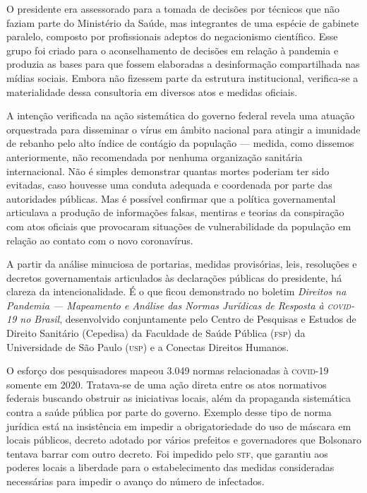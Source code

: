 O presidente era assessorado para a tomada de decisões por técnicos que
não faziam parte do Ministério da Saúde, mas integrantes de uma espécie
de gabinete paralelo, composto por profissionais adeptos do negacionismo
científico. Esse grupo foi criado para o aconselhamento de decisões em
relação à pandemia e produzia as bases para que fossem elaboradas a
desinformação compartilhada nas mídias sociais. Embora não fizessem
parte da estrutura institucional, verifica-se a materialidade dessa
consultoria em diversos atos e medidas oficiais.

A intenção verificada na ação sistemática do governo federal revela uma
atuação orquestrada para disseminar o vírus em âmbito nacional para
atingir a imunidade de rebanho pelo alto índice de contágio da
população --- medida, como dissemos anteriormente, não recomendada por
nenhuma organização sanitária internacional. Não é simples demonstrar
quantas mortes poderiam ter sido evitadas, caso houvesse uma conduta
adequada e coordenada por parte das autoridades públicas. Mas é possível
confirmar que a política governamental articulava a produção de
informações falsas, mentiras e teorias da conspiração com atos oficiais
que provocaram situações de vulnerabilidade da população em relação ao
contato com o novo coronavírus.

A partir da análise minuciosa de portarias, medidas provisórias,
leis, resoluções e decretos governamentais articulados às declarações
públicas do presidente, há clareza da intencionalidade. É o que ficou
demonstrado no boletim \textit{Direitos na Pandemia --- Mapeamento e Análise das
Normas Jurídicas de Resposta à \textsc{covid-19} no Brasil}, desenvolvido
conjuntamente pelo Centro de Pesquisas e Estudos de Direito Sanitário
(Cepedisa) da Faculdade de Saúde Pública (\textsc{fsp}) da Universidade de São
Paulo (\textsc{usp}) e a Conectas Direitos Humanos.

O esforço dos pesquisadores mapeou 3.049 normas relacionadas à \textsc{covid-19}
somente em 2020. Tratava-se de uma ação direta entre os atos normativos
federais buscando obstruir as iniciativas locais, além da propaganda
sistemática contra a saúde pública por parte do governo. Exemplo desse
tipo de norma jurídica está na insistência em impedir a obrigatoriedade
do uso de máscara em locais públicos, decreto adotado por vários
prefeitos e governadores que Bolsonaro tentava barrar com outro decreto.
Foi impedido pelo \textsc{stf}, que garantiu aos poderes locais a liberdade para
o estabelecimento das medidas consideradas necessárias para impedir o
avanço do número de infectados.

